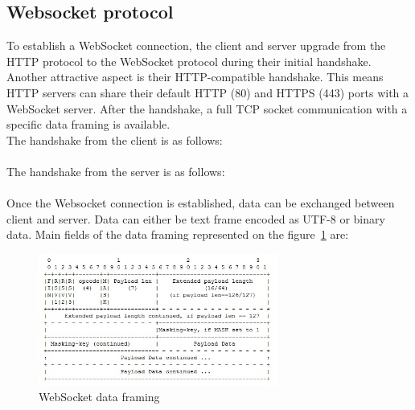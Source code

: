 \documentclass[pdftex,10pt,a4paper]{report}
\begin{document}
\subsection{Websocket protocol}

To establish a WebSocket connection, the client and server upgrade from the HTTP protocol to the WebSocket protocol during their initial handshake. Another attractive aspect is their HTTP-compatible handshake. This means HTTP servers can share their default HTTP (80) and HTTPS (443) ports with a WebSocket server. After the handshake, a full TCP socket communication with a specific data framing is available. \\

The handshake from the client is as follows: \\

\\


The handshake from the server is as follows: \\

 \\


Once the Websocket connection is established, data can be exchanged between client and server. Data can either be text frame encoded as UTF-8 or binary data. Main fields of the data framing represented on the figure~\ref{WebSocket data framing} are:

\begin{figure}[h!]
		\centering
		\includegraphics[width=0.7\textwidth]{./frame_ws.jpg}
		\caption{WebSocket data framing}
		\label{WebSocket data framing}
\end{figure}
\end{document}
